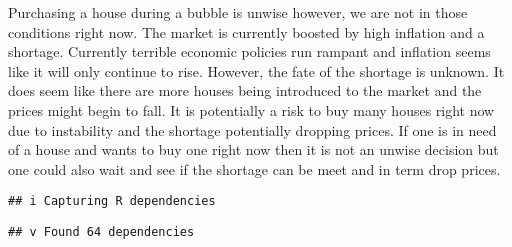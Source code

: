 \documentclass[
]{article}
\begin{document}
Purchasing a house during a bubble is unwise however, we are not in
those conditions right now. The market is currently boosted by high
inflation and a shortage. Currently terrible economic policies run
rampant and inflation seems like it will only continue to rise. However,
the fate of the shortage is unknown. It does seem like there are more
houses being introduced to the market and the prices might begin to
fall. It is potentially a risk to buy many houses right now due to
instability and the shortage potentially dropping prices. If one is in
need of a house and wants to buy one right now then it is not an unwise
decision but one could also wait and see if the shortage can be meet and
in term drop prices.

\begin{verbatim}
## i Capturing R dependencies
\end{verbatim}

\begin{verbatim}
## v Found 64 dependencies
\end{verbatim}
\end{document}
